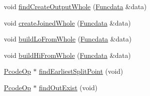 \begin{DoxyCompactItemize}
\item 
void \mbox{\hyperlink{class_split_varnode_a6b3c7a86293983e897c0da90f46d1499}{find\+Create\+Output\+Whole}} (\mbox{\hyperlink{class_funcdata}{Funcdata}} \&data)
\item 
void \mbox{\hyperlink{class_split_varnode_ad1c85dd3deb4c5e9a18e0c815feec95a}{create\+Joined\+Whole}} (\mbox{\hyperlink{class_funcdata}{Funcdata}} \&data)
\item 
void \mbox{\hyperlink{class_split_varnode_ae9cef4fbd2931fb270988180eab642ad}{build\+Lo\+From\+Whole}} (\mbox{\hyperlink{class_funcdata}{Funcdata}} \&data)
\item 
void \mbox{\hyperlink{class_split_varnode_a09d3bd3c551ee55ef42da4f01bc44f49}{build\+Hi\+From\+Whole}} (\mbox{\hyperlink{class_funcdata}{Funcdata}} \&data)
\item 
\mbox{\hyperlink{class_pcode_op}{Pcode\+Op}} $\ast$ \mbox{\hyperlink{class_split_varnode_a2368506098ff81b475bc1e32d428a16c}{find\+Earliest\+Split\+Point}} (void)
\item 
\mbox{\hyperlink{class_pcode_op}{Pcode\+Op}} $\ast$ \mbox{\hyperlink{class_split_varnode_a19a8c2ae5257a563a5a0e7d3ccd7704e}{find\+Out\+Exist}} (void)
\end{DoxyCompactItemize}
